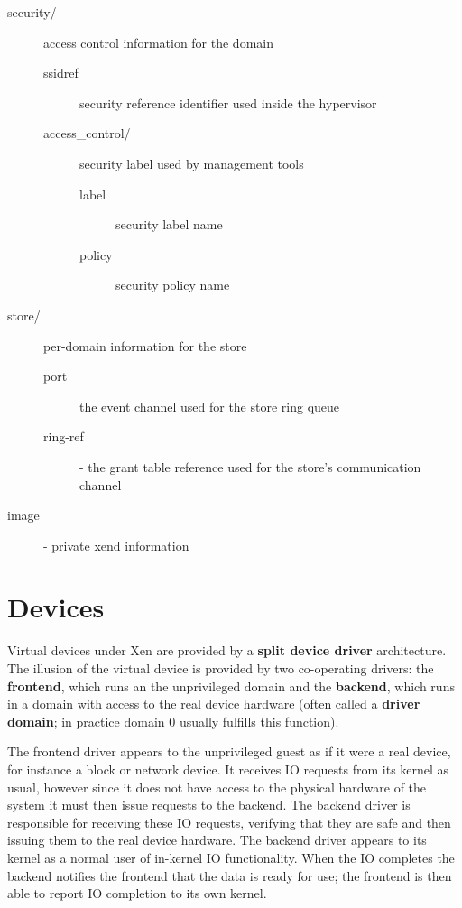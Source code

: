 \documentclass[11pt,twoside,final,openright]{report}
\begin{document}
\begin{description}
  \item[security/] access control information for the domain
    \begin{description}
    \item[ssidref] security reference identifier used inside the hypervisor
    \item[access\_control/] security label used by management tools
      \begin{description}
       \item[label] security label name
       \item[policy] security policy name
      \end{description}
    \end{description}

  \item[store/] per-domain information for the store
    \begin{description}
    \item[port] the event channel used for the store ring queue 
    \item[ring-ref] - the grant table reference used for the store's
      communication channel 
    \end{description}
    
  \item[image] - private xend information 
\end{description}


\chapter{Devices}
\label{c:devices}

Virtual devices under Xen are provided by a {\bf split device driver}
architecture.  The illusion of the virtual device is provided by two
co-operating drivers: the {\bf frontend}, which runs an the
unprivileged domain and the {\bf backend}, which runs in a domain with
access to the real device hardware (often called a {\bf driver
domain}; in practice domain 0 usually fulfills this function).

The frontend driver appears to the unprivileged guest as if it were a
real device, for instance a block or network device.  It receives IO
requests from its kernel as usual, however since it does not have
access to the physical hardware of the system it must then issue
requests to the backend.  The backend driver is responsible for
receiving these IO requests, verifying that they are safe and then
issuing them to the real device hardware.  The backend driver appears
to its kernel as a normal user of in-kernel IO functionality.  When
the IO completes the backend notifies the frontend that the data is
ready for use; the frontend is then able to report IO completion to
its own kernel.
\end{document}

